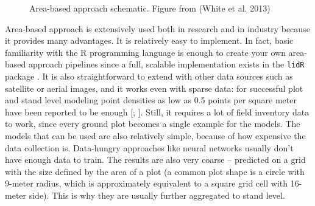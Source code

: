 \begin{figure}
\caption[Area-based approach schematic]{\label{fig-aba-schema}Area-based approach schematic. Figure
from (White et al. 2013)}
\end{figure}

Area-based approach is extensively used both in research and in industry because it provides many advantages.
It is relatively easy to implement.
In fact, basic familiarity with the R programming language is enough to create your own area-based approach pipelines since a full, scalable implementation exists in the \texttt{lidR} package \citep{rousselLidRPackage2020}.
It is also straightforward to extend with other data sources such as satellite or aerial images, and it works even with sparse data: for successful plot and stand level modeling point densities as low as 0.5 points per square meter have been reported to be enough [\citet{treitzLiDARSamplingDensity2012}; \citet{jakubowskiTradeoffsLidarPulse2013}].
Still, it requires a lot of field inventory data to work, since every ground plot becomes a single example for the models.
The models that can be used are also relatively simple, because of how expensive the data collection is.
Data-hungry approaches like neural networks usually don't have enough data to train.
The results are also very coarse – predicted on a grid with the size defined by the area of a plot (a common plot shape is a circle with 9-meter radius, which is approximately equivalent to a square grid cell with 16-meter side).
This is why they are usually further aggregated to stand level.

